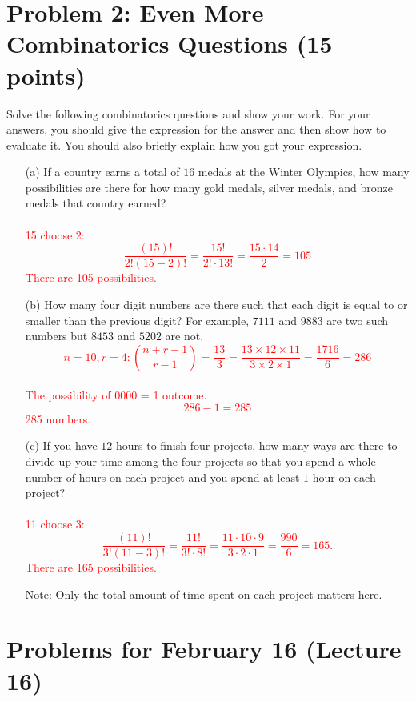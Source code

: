 \documentclass[12pt]{article}
\begin{document}
\section*{Problem 2: Even More Combinatorics Questions (15 points)}
Solve the following combinatorics questions and show your work. For your answers, you should give the expression for the answer and then show how to evaluate it. You should also briefly explain how you got your expression.
\begin{enumerate}

\item[(a)] If a country earns a total of $16$ medals at the Winter Olympics, how many possibilities are there for how many gold medals, silver medals, and bronze medals that country earned? \\
\\ \textcolor{red}{15 choose 2: $$ \frac{(15)!}{2!(15-2)!} = \frac{15!}{2! \cdot 13!} = \frac{15 \cdot 14}{2} = 105$$ There are 105 possibilities.}

\item[(b)] How many four digit numbers are there such that each digit is equal to or smaller than the previous digit? For example, $7111$ and $9883$ are two such numbers but $8453$ and $5202$ are not.
\\ \textcolor{red}{$$ n = 10, r = 4: \binom{n+r-1}{r-1} = \frac{13}{3} = \frac{13 \times 12 \times 11}{3 \times 2 \times 1} = \frac{1716}{6} = 286$$}
\\ \textcolor{red}{The possibility of 0000 = 1 outcome.}
\\ \textcolor{red}{$$286-1=285$$}
\textcolor{red}{285 numbers.}

\item[(c)] If you have $12$ hours to finish four projects, how many ways are there to divide up your time among the four projects so that you spend a whole number of hours on each project and you spend at least $1$ hour on each project? \\
\\ \textcolor{red}{11 choose 3: $$ \frac{(11)!}{3!(11-3)!} = \frac{11!}{3! \cdot 8!} = \frac{11 \cdot 10 \cdot 9}{3 \cdot 2 \cdot 1} = \frac{990}{6} = 165.$$ There are 165 possibilities.}

Note: Only the total amount of time spent on each project matters here.
\end{enumerate}
\section{Problems for February 16 (Lecture 16)}
\end{document}
